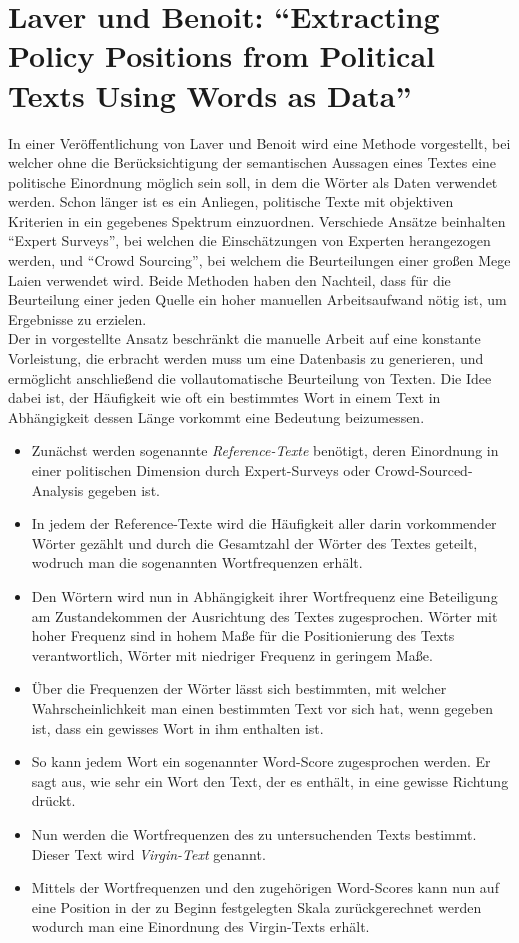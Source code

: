 
\section{Laver und Benoit: \enquote{Extracting Policy Positions from Political Texts Using Words as Data}  }
In einer Veröffentlichung von Laver und Benoit \cite{LuB} wird eine Methode vorgestellt, bei welcher ohne die Berücksichtigung der semantischen Aussagen eines Textes eine politische Einordnung möglich sein soll, in dem die Wörter als Daten verwendet werden. 
Schon länger ist es ein Anliegen, politische Texte mit objektiven Kriterien in ein gegebenes Spektrum einzuordnen. Verschiede Ansätze beinhalten \enquote{Expert Surveys}, bei welchen die Einschätzungen von Experten herangezogen werden, und \enquote{Crowd Sourcing}, bei welchem die Beurteilungen einer großen Mege Laien verwendet wird. Beide Methoden haben den Nachteil, dass für die Beurteilung einer jeden Quelle ein hoher manuellen Arbeitsaufwand nötig ist, um Ergebnisse zu erzielen. \\
Der in  \cite{LuB} vorgestellte Ansatz beschränkt die manuelle Arbeit auf eine konstante Vorleistung, die erbracht werden muss um eine Datenbasis zu generieren, und ermöglicht anschließend die vollautomatische Beurteilung von Texten. Die Idee dabei ist, der Häufigkeit wie oft ein bestimmtes Wort in einem Text in Abhängigkeit dessen Länge vorkommt eine Bedeutung beizumessen. 
\begin{itemize}
\item Zunächst werden sogenannte \emph{Reference-Texte} benötigt, deren Einordnung in einer politischen Dimension durch Expert-Surveys oder Crowd-Sourced-Analysis gegeben ist.
\item In jedem der Reference-Texte wird die Häufigkeit aller darin vorkommender Wörter gezählt und durch die Gesamtzahl der Wörter des Textes geteilt, wodruch man die sogenannten Wortfrequenzen erhält.
\item Den Wörtern wird nun in Abhängigkeit ihrer Wortfrequenz eine Beteiligung am Zustandekommen der Ausrichtung des Textes zugesprochen. Wörter mit hoher Frequenz sind in hohem Maße für die Positionierung des Texts verantwortlich, Wörter mit niedriger Frequenz in geringem Maße.
\item Über die Frequenzen der Wörter lässt sich bestimmten, mit welcher Wahrscheinlichkeit man einen bestimmten Text vor sich hat, wenn gegeben ist, dass ein gewisses Wort in ihm enthalten ist.
\item So kann jedem Wort ein sogenannter Word-Score zugesprochen werden. Er sagt aus, wie sehr ein Wort den Text, der es enthält, in eine gewisse Richtung drückt.
\item Nun werden die Wortfrequenzen des zu untersuchenden Texts bestimmt. Dieser Text wird \emph{Virgin-Text} genannt.
\item Mittels der Wortfrequenzen und den zugehörigen Word-Scores kann nun auf eine Position in der zu Beginn festgelegten Skala zurückgerechnet werden wodurch man eine Einordnung des Virgin-Texts erhält.  
\end{itemize}


